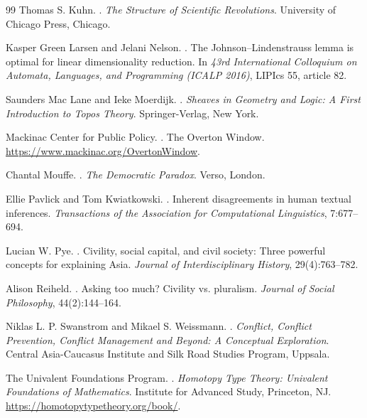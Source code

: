 \documentclass[12pt]{article}
\begin{document}
\begin{thebibliography}{99}
Thomas S. Kuhn.
.
\newblock \emph{The Structure of Scientific Revolutions}.
\newblock University of Chicago Press, Chicago.

Kasper Green Larsen and Jelani Nelson.
.
\newblock The Johnson--Lindenstrauss lemma is optimal for linear dimensionality reduction.
\newblock In \emph{43rd International Colloquium on Automata, Languages, and Programming (ICALP 2016)}, LIPIcs 55, article 82.

Saunders Mac Lane and Ieke Moerdijk.
.
\newblock \emph{Sheaves in Geometry and Logic: A First Introduction to Topos Theory}.
\newblock Springer-Verlag, New York.

Mackinac Center for Public Policy.
.
\newblock The Overton Window.
\newblock \url{https://www.mackinac.org/OvertonWindow}.

Chantal Mouffe.
.
\newblock \emph{The Democratic Paradox}.
\newblock Verso, London.

Ellie Pavlick and Tom Kwiatkowski.
.
\newblock Inherent disagreements in human textual inferences.
\newblock \emph{Transactions of the Association for Computational Linguistics}, 7:677--694.

Lucian W. Pye.
.
\newblock Civility, social capital, and civil society: Three powerful concepts for explaining Asia.
\newblock \emph{Journal of Interdisciplinary History}, 29(4):763--782.

Alison Reiheld.
.
\newblock Asking too much? Civility vs. pluralism.
\newblock \emph{Journal of Social Philosophy}, 44(2):144--164.

Niklas L. P. Swanstrom and Mikael S. Weissmann.
.
\newblock \emph{Conflict, Conflict Prevention, Conflict Management and Beyond: A Conceptual Exploration}.
\newblock Central Asia-Caucasus Institute and Silk Road Studies Program, Uppsala.

The Univalent Foundations Program.
.
\newblock \emph{Homotopy Type Theory: Univalent Foundations of Mathematics}.
\newblock Institute for Advanced Study, Princeton, NJ.
\newblock \url{https://homotopytypetheory.org/book/}.


\end{thebibliography}
\end{document}
